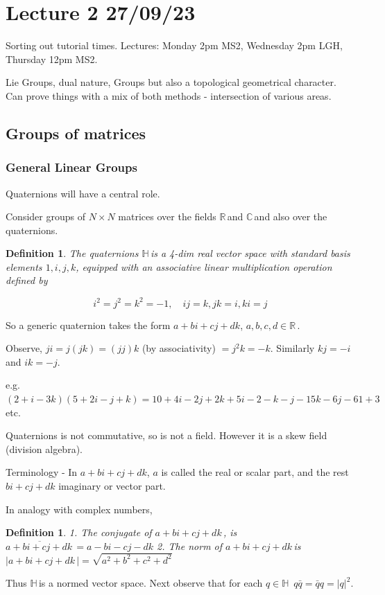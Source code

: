 \documentclass[12pt,a4paper]{article}
\newcommand{\rR}{\ensuremath{\mathbb{R}\,}}
\newcommand{\cC}{\ensuremath{\mathbb{C}\,}}
\newcommand{\hH}{\ensuremath{\mathbb{H}\,}}
\newcommand{\qQ}{\ensuremath{a+bi+cj+dk\,}}
\newtheorem{defn}[thm]{Definition}
\begin{document}
\section{Lecture 2 27/09/23}
Sorting out tutorial times. Lectures: Monday 2pm MS2, Wednesday 2pm LGH, Thursday 12pm MS2.

Lie Groups, dual nature, Groups but also a topological geometrical character. Can prove things with a mix of both methods - intersection of various areas.

\subsection{Groups of matrices}
\subsubsection{General Linear Groups}

Quaternions will have a central role.

Consider groups of $N\times N$ matrices over the fields \rR and \cC and also over the quaternions.

\begin{defn}
The quaternions \hH is a 4-dim real vector space with standard basis elements $1,i,j,k$, equipped with an associative linear multiplication operation defined by

\[i^2=j^2=k^2=-1, \quad ij=k, jk=i, ki=j\]
\end{defn}

So a generic quaternion takes the form $a+bi+cj+dk$, $a,b,c,d \in \rR$.

Observe, $ji=j(jk)=(jj)k$ (by associativity) $=j^2k=-k$. Similarly $kj=-i$ and $ik=-j$.

e.g. $(2+i-3k)(5+2i-j+k)=10+4i-2j+2k+5i-2-k-j-15k-6j-61+3$ etc.

Quaternions is not commutative, so is not a field. However it is a skew field (division algebra).

Terminology - In $a+bi+cj+dk$, $a$ is called the real or scalar part, and the rest $bi+cj+dk$ imaginary or vector part.

In analogy with complex numbers,

\begin{defn} 
1. The conjugate of  \qQ , is $\overline{\qQ}=a-bi-cj-dk$
2. The norm of \qQ is  $|\qQ |=\sqrt{a^2+b^2+c^2+d^2}$
\end{defn}

Thus \hH is a normed vector space. Next observe that for each $q\in\hH$ $q\bar{q}=\bar{q}q = |q|^2$.
\end{document}
